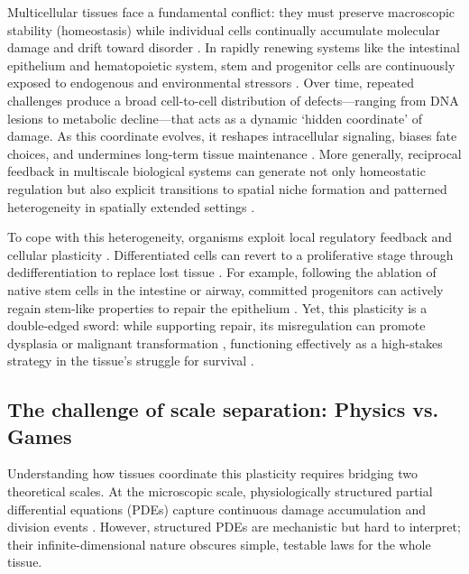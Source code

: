 \documentclass[pdflatex,sn-mathphys-ay]{sn-jnl}
\theoremstyle{thmstyleone}
\theoremstyle{definition}
\theoremstyle{remark}
\begin{document}
Multicellular tissues face a fundamental conflict:
they must preserve macroscopic stability (homeostasis) while individual cells continually accumulate molecular damage and drift toward disorder 
\citep{xavier_da_silveira_dos_santos_single_2019,guillot_mechanics_2013}.
In rapidly renewing systems like the intestinal epithelium and hematopoietic system, stem and progenitor cells are continuously exposed to endogenous and environmental stressors  \citep{chiacchiera_transcriptional_2019,beumer_regulation_2016}.
Over time, repeated challenges produce a broad cell-to-cell distribution of defects---ranging from DNA lesions to metabolic decline---that acts as a dynamic `hidden coordinate' of damage.
As this coordinate evolves, it reshapes intracellular signaling, biases fate choices, and undermines long-term tissue maintenance \citep{jones_stem_2023,mcneely_dna_2020,chatterjee_aging_2021,mi_mechanism_2022,liu_stem_2022,oh_stem_2014}.
More generally, reciprocal feedback in multiscale biological systems can generate not only homeostatic regulation but also explicit transitions to spatial niche formation and patterned heterogeneity in spatially extended settings \citep{yu_chemotactic_2026}.

To cope with this heterogeneity, organisms exploit local regulatory feedback and cellular plasticity \citep{lou_homeostasis_2019,biteau_maintaining_2011,bates_agent-based_2023}.
Differentiated cells can revert to a proliferative stage through dedifferentiation to replace lost tissue \citep{jopling_dedifferentiation_2011, blanpain_plasticity_2014}.
For example, following the ablation of native stem cells in the intestine or airway, committed progenitors can actively regain stem-like properties to repair the epithelium \citep{murata_ascl2-dependent_2020, tata_dedifferentiation_2013, tetteh_replacement_2016}. 
Yet, this plasticity is a double-edged sword: while supporting repair, its misregulation can promote dysplasia or malignant transformation \citep{van_der_heijden_stem_2019,beumer_regulation_2016,chiacchiera_transcriptional_2019}, functioning effectively as a high-stakes strategy in the tissue's struggle for survival \citep{bensellam_mechanisms_2018, nordmann_role_2017}.

\subsection{The challenge of scale separation: Physics vs. Games}
Understanding how tissues coordinate this plasticity requires bridging two theoretical scales.
At the microscopic scale, physiologically structured partial differential equations (PDEs) capture continuous damage accumulation and division events 
\citep{magal_theory_2018,perthame_transport_2007,cui_hopf-bifurcation_2024,zhang_periodic_2019}.
However, structured PDEs are mechanistic but hard to interpret; their infinite-dimensional nature obscures simple, testable laws for the whole tissue.
\end{document}
